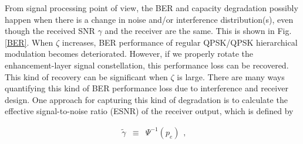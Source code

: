 \documentclass[10pt,fleqn, twocolumn]{IEEEtran}
\begin{document}

\begin{figure}
\end{figure}

From signal processing point of view, the BER and capacity
degradation possibly happen when there is a change in noise and/or
interference distribution(s), even though the received SNR
$\gamma$ and the receiver are the same. This is shown in Fig.
\ref{BER}. When $\zeta$ increases, BER performance of regular
QPSK/QPSK hierarchical modulation becomes deteriorated. However,
if we properly rotate the enhancement-layer signal constellation,
this performance loss can be recovered. This kind of recovery can
be significant when $\zeta$ is large. There are many ways
quantifying this kind of BER performance loss due to interference
and receiver design. One approach for capturing this kind of
degradation is to calculate the effective signal-to-noise ratio
(ESNR) of the receiver output, which is defined by

\begin{equation}
\begin{array}{rcl}
\tilde{\gamma}&\equiv&\Psi^{-1}\left(p_{e}\right)
\end{array},\label{eff_SNR}
\end{equation}
\end{document}
